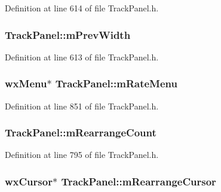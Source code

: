 Definition at line 614 of file Track\+Panel.\+h.

\subsubsection[{\texorpdfstring{m\+Prev\+Width}{mPrevWidth}}]{ Track\+Panel\+::m\+Prev\+Width\hspace{0.3cm}{\ttfamily [protected]}}\hypertarget{class_track_panel_a5e5f21ee396e4dcddb50cec279b35dca}{}\label{class_track_panel_a5e5f21ee396e4dcddb50cec279b35dca}


Definition at line 613 of file Track\+Panel.\+h.

\subsubsection[{\texorpdfstring{m\+Rate\+Menu}{mRateMenu}}]{\setlength{\rightskip}{0pt plus 5cm}wx\+Menu$\ast$ Track\+Panel\+::m\+Rate\+Menu\hspace{0.3cm}{\ttfamily [protected]}}\hypertarget{class_track_panel_ab6871e1e28183f7c71e2b2457e3036b8}{}\label{class_track_panel_ab6871e1e28183f7c71e2b2457e3036b8}


Definition at line 851 of file Track\+Panel.\+h.

\subsubsection[{\texorpdfstring{m\+Rearrange\+Count}{mRearrangeCount}}]{ Track\+Panel\+::m\+Rearrange\+Count\hspace{0.3cm}{\ttfamily [protected]}}\hypertarget{class_track_panel_aea9069b09b6fff4b7032754a85627331}{}\label{class_track_panel_aea9069b09b6fff4b7032754a85627331}


Definition at line 795 of file Track\+Panel.\+h.

\subsubsection[{\texorpdfstring{m\+Rearrange\+Cursor}{mRearrangeCursor}}]{\setlength{\rightskip}{0pt plus 5cm}wx\+Cursor$\ast$ Track\+Panel\+::m\+Rearrange\+Cursor\hspace{0.3cm}{\ttfamily [protected]}}\hypertarget{class_track_panel_a854ecb221e26a9f55cde793a134894d9}{}\label{class_track_panel_a854ecb221e26a9f55cde793a134894d9}


